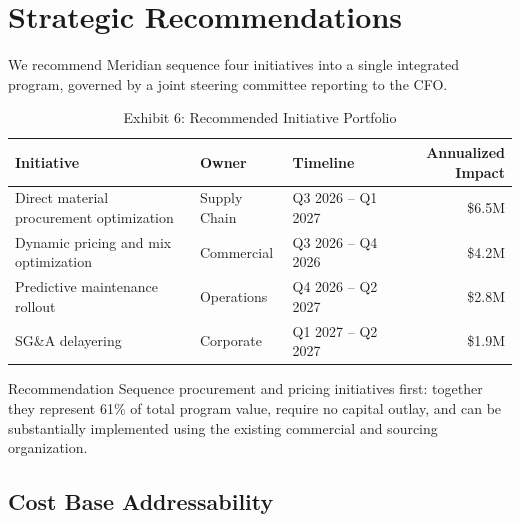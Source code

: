 \section{Strategic Recommendations}

We recommend Meridian sequence four initiatives into a single integrated program, governed by a joint steering committee reporting to the CFO.

\begin{table}[htbp]
\centering
\small
\begin{tabularx}{\linewidth}{@{}>{\raggedright\arraybackslash}X>{\raggedright\arraybackslash}p{2.6cm}>{\raggedright\arraybackslash}p{2.6cm}r@{}}
\toprule
\textbf{Initiative} & \textbf{Owner} & \textbf{Timeline} & \textbf{Annualized Impact} \\
\midrule
Direct material procurement optimization & Supply Chain & Q3 2026 -- Q1 2027 & \$6.5M \\
Dynamic pricing and mix optimization & Commercial & Q3 2026 -- Q4 2026 & \$4.2M \\
Predictive maintenance rollout & Operations & Q4 2026 -- Q2 2027 & \$2.8M \\
SG\&A delayering & Corporate & Q1 2027 -- Q2 2027 & \$1.9M \\
\bottomrule
\end{tabularx}
\caption{Exhibit 6: Recommended Initiative Portfolio}
\end{table}

\begin{calloutbox}[gold]{Recommendation}
Sequence procurement and pricing initiatives first: together they represent 61\% of total program value, require no capital outlay, and can be substantially implemented using the existing commercial and sourcing organization.
\end{calloutbox}

\subsection{Cost Base Addressability}


